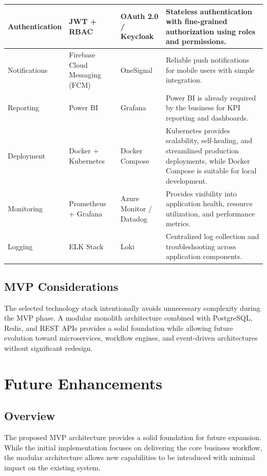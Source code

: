 \documentclass[11pt]{article}
\begin{document}
\begin{longtable}{|>{\raggedright\arraybackslash}p{}|>{\raggedright\arraybackslash}p{}|>{\raggedright\arraybackslash}p{}|>{\raggedright\arraybackslash}p{}|}
    \hline
    Authentication & JWT + RBAC & OAuth 2.0 / Keycloak & Stateless
    authentication with fine-grained authorization using roles and
    permissions. \\
    \hline
    Notifications & Firebase Cloud Messaging (FCM) & OneSignal & Reliable push
    notifications for mobile users with simple integration. \\
    \hline
    Reporting & Power BI & Grafana & Power BI is already required by the
    business for KPI reporting and dashboards. \\
    \hline
    Deployment & Docker + Kubernetes & Docker Compose & Kubernetes provides
    scalability, self-healing, and streamlined production deployments, while
    Docker Compose is suitable for local development. \\
    \hline
    Monitoring & Prometheus + Grafana & Azure Monitor / Datadog & Provides
    visibility into application health, resource utilization, and performance
    metrics. \\
    \hline
    Logging & ELK Stack & Loki & Centralized log collection and troubleshooting
    across application components. \\
    \hline
\end{longtable}
\renewcommand{\arraystretch}{1}
\endgroup

\subsection{MVP Considerations}

The selected technology stack intentionally avoids unnecessary complexity
during the MVP phase. A modular monolith architecture combined with PostgreSQL,
Redis, and REST APIs provides a solid foundation while allowing future
evolution toward microservices, workflow engines, and event-driven
architectures without significant redesign.

\clearpage
\section{Future Enhancements}

\subsection{Overview}

The proposed MVP architecture provides a solid foundation for future
expansion. While the initial implementation focuses on delivering the core
business workflow, the modular architecture allows new capabilities to be
introduced with minimal impact on the existing system.
\end{document}
